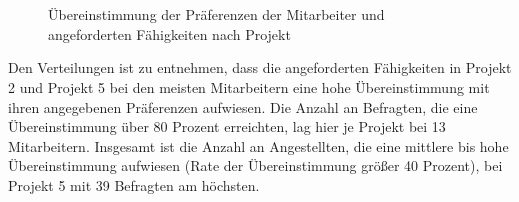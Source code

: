 \begin{figure}
    \\
    \\
\caption[Übereinstimmung der Präferenzen der Mitarbeiter und angeforderten Fähigkeiten nach Projekt]{Übereinstimmung der Präferenzen der Mitarbeiter und angeforderten Fähigkeiten nach Projekt}
  \label{fig:ergebnisse:abb4}
\end{figure}
Den Verteilungen ist zu entnehmen, dass die angeforderten Fähigkeiten in Projekt 2 und Projekt 5 bei den meisten Mitarbeitern eine hohe Übereinstimmung mit ihren angegebenen Präferenzen aufwiesen.
Die Anzahl an Befragten, die eine Übereinstimmung über 80 Prozent erreichten, lag hier je Projekt bei 13 Mitarbeitern.
Insgesamt ist die Anzahl an Angestellten, die eine mittlere bis hohe Übereinstimmung aufwiesen (Rate der Übereinstimmung größer 40 Prozent), bei Projekt 5 mit 39 Befragten am höchsten.

